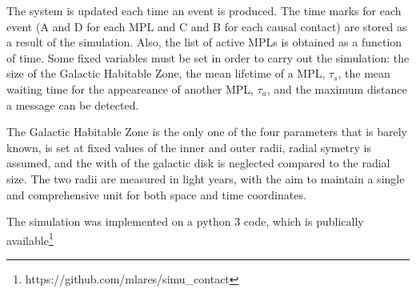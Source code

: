                         

The system is updated each time an event is produced.
%
The time marks for each event (A and D for each MPL and C and B for
each causal contact) are stored as a result of the simulation.
%
Also, the list of active MPLs is obtained as a function of time.
%
Some fixed variables must be set in order to carry out the simulation:
the size of the Galactic Habitable Zone, the mean lifetime of a MPL,
$\tau_s$, the mean waiting time for the appeareance of another MPL,
$\tau_a$, and the maximum distance a message can be detected.



The Galactic Habitable Zone is the only one of the four parameters
that is barely known, is set at fixed values of the inner and outer
radii, radial symetry is assumed, and the with of the galactic disk is
neglected compared to the radial size.
%
The two radii are measured in light years, with the aim to maintain a
single and comprehensive unit for both space and time coordinates. 

The simulation was implemented on a python 3 code, which is publically
available\footnote{https://github.com/mlares/simu\_contact}

                                  


